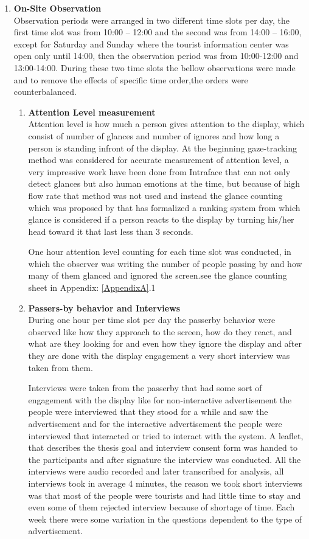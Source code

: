 \begin{enumerate}
\item \textbf{On-Site Observation} \\
Observation periods were arranged in two different time slots per day, the first time slot was from 10:00 – 12:00 and the second was from 14:00 – 16:00, except for Saturday and Sunday where the tourist information center was open only until 14:00, then the observation period was from 10:00-12:00 and 13:00-14:00. During these two time slots the bellow observations were made and to remove the effects of specific time order,the orders were counterbalanced.

\begin{enumerate}
\item \textbf{Attention Level measurement} \\
Attention level is how much a person gives attention to the display, which consist of number of glances and number of ignores and how long a person is standing infront of the display. At the beginning gaze-tracking method was considered for accurate measurement of attention level, a very impressive work have been done from Intraface \cite{Intraface} that can not only detect glances but also human emotions at the time, but because of high flow rate that method was not used and instead the glance counting which was proposed by \cite{glancingcount} that has formalized a ranking system from which  glance is considered if a person reacts to the display by turning his/her head toward it that last less than 3 seconds.

One hour attention level counting for each time slot was conducted, in which the observer was writing the number of people passing by and how many of them glanced and ignored the screen.see the glance counting sheet in Appendix: \ref{AppendixA}.1


\item \textbf{Passers-by behavior and Interviews} \\
During one hour per time slot per day the passerby behavior were observed like how they approach to the screen, how do they react, and what are they looking for and even how they ignore the display and after they are done with the display engagement a very short interview was taken from them. 

Interviews were taken from the passerby that had some sort of engagement with the display like for non-interactive advertisement the people were interviewed that they stood for a while and saw the advertisement and for the interactive advertisement the people were interviewed that interacted or tried to interact with the system.
A leaflet, that describes the thesis goal and interview consent form was handed to the participants and after signature the interview was conducted. All the interviews were audio recorded and later transcribed for analysis, all interviews took in average 4 minutes, the reason we took short interviews was that most of the people were tourists and had little time to stay and even some of them rejected interview because of shortage of time.
Each week there were some variation in the questions dependent to the type of advertisement.  



\end{enumerate}
\end{enumerate}
